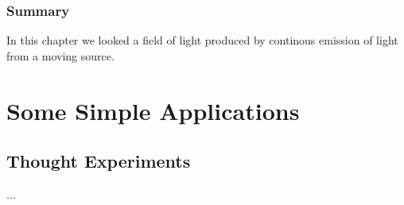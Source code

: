 \section{Summary}

In this chapter we looked a field of light produced by continous emission of light from a moving source.



\printbibliography[segment=\therefsegment, heading=subbibliography]

\part{Some Simple Applications}


\chapter{Thought Experiments}\label{sect: More Thought Experiments}

...
